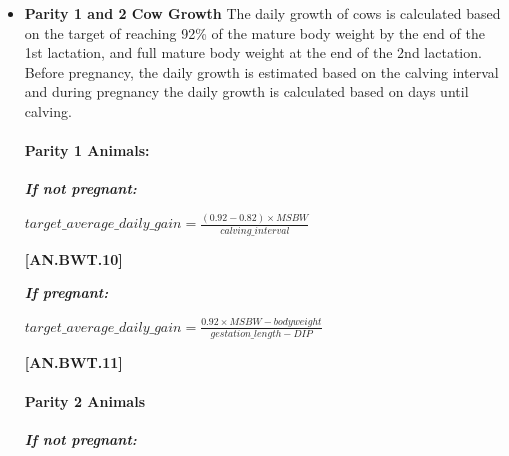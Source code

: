 \begin{refsection}
\begin{itemize}
    {\raggedleft \textbf{[AN.BWT.9]}\par}
    
    \item \textbf{Parity 1 and 2 Cow Growth} The daily growth of cows is calculated based on the target of reaching 92\% of the mature body weight by the end of the 1st lactation, and full mature body weight at the end of the 2nd lactation. Before pregnancy, the daily growth is estimated based on the calving interval and during pregnancy the daily growth is calculated based on days until calving. 
    \vspace{0.5cm}
    
    \paragraph{Parity 1 Animals:}
    \vspace{0.25cm}
    
    \textbf{\textit{If not pregnant:}}
    \vspace{0.5cm}
    
\begin{center}
    \(target\_average\_daily\_gain = \frac{(0.92-0.82) × MSBW}{calving\_interval}\)
\end{center}
    \vspace{0.5cm}
    
    {\raggedleft \textbf{[AN.BWT.10]}\par}
    \vspace{0.5cm}
    
    \textbf{\textit{If pregnant:}}
    \vspace{0.5cm}
    
\begin{center}
    \(target\_average\_daily\_gain = \frac{0.92 × MSBW - bodyweight}{gestation\_length - DIP}\)
\end{center}
    \vspace{0.5cm}
    
    {\raggedleft \textbf{[AN.BWT.11]}\par}
    \vspace{0.5cm}

    \paragraph{Parity 2 Animals}
    \vspace{0.5cm}

    
    \textbf{\textit{If not pregnant:}}
    \vspace{0.5cm}
    

\end{itemize}
\end{refsection}
